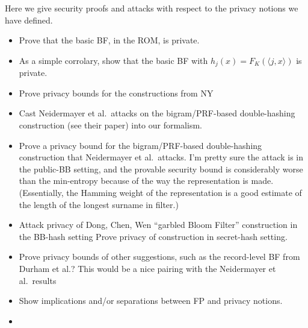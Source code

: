  Here we give security proofs and attacks with respect to the privacy notions we have defined.
\begin{itemize}
\item Prove that the basic BF, in the ROM, is private.  

\item As a simple corrolary, show that the basic BF with $h_j(x)=F_K(\langle j,x \rangle)$ is private.  

\item Prove privacy bounds for the constructions from NY

\item Cast Neidermayer et al.\ attacks on the bigram/PRF-based double-hashing construction (see their paper) into our formalism.   

\item Prove a privacy bound for the bigram/PRF-based double-hashing construction that Neidermayer et al.\ attacks. I'm pretty sure the attack is in the public-BB setting, and the provable security bound is considerably worse than the min-entropy because of the way the representation is made.  (Essentially, the Hamming weight of the representation is a good estimate of the length of the longest surname in filter.)

\item Attack privacy of Dong, Chen, Wen ``garbled Bloom Filter'' construction in the BB-hash setting   Prove privacy of construction in secret-hash setting.  

\item Prove privacy bounds of other suggestions, such as the record-level BF from Durham et al.?  This would be a nice pairing with the Neidermayer et al.\ results

\item Show implications and/or separations between FP and privacy notions. 

\item {}
\end{itemize}
